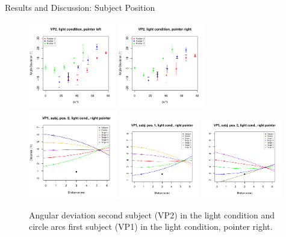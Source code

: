 \documentclass{beamer}
\begin{document}
\begin{frame}{Results and Discussion: Subject Position}
    \begin{minipage}{12cm}
        \begin{figure}
            \centering
            \includegraphics[clip, trim = 0cm 0.5cm 0.5cm 0.6cm, width = 3.8cm]{Images/plots/AngleDevVP2LightLeft.pdf}
            \includegraphics[clip, trim = 0cm 0.5cm 0.5cm 0.6cm, width = 3.8cm]{Images/plots/AngleDevVP2LightRight.pdf}\\
            \includegraphics[clip, trim = 0.1cm 0.5cm 0.95cm 0.6cm, width=3.85cm]{Images/plots/VP1lightrightPos0Curves.pdf}
            \includegraphics[clip, trim = 1.15cm 0.5cm 0.95cm 0.6cm, width=3.5cm]{Images/plots/VP1lightrightPos1Curves.pdf}
            \includegraphics[clip, trim = 1.15cm 0.5cm 0.95cm 0.6cm, width=3.5cm]{Images/plots/VP1lightrightPos2Curves.pdf}
            \caption{Angular deviation second subject (VP2) in the light condition and circle arcs first subject (VP1) in the light condition, pointer right.}
            \label{DevVP2}
        \end{figure}
    \end{minipage}
\end{frame}
\end{document}
